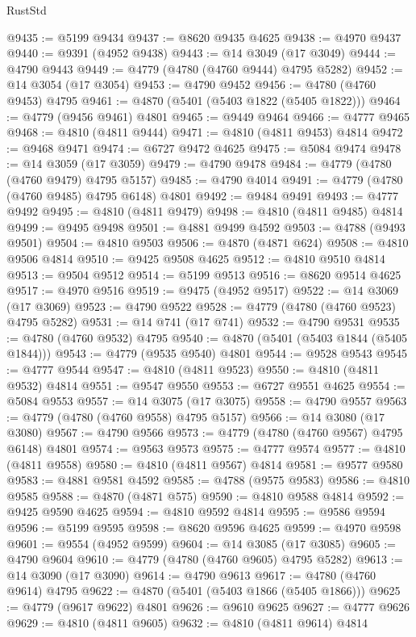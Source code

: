 \begin{lexlean}{RustStd}
\begin{coremodule}
@9435 := @5199 @9434
@9437 := @8620 @9435 @4625
@9438 := @4970 @9437
@9440 := @9391 (@4952 @9438)
@9443 := @14 @3049 (@17 @3049)
@9444 := @4790 @9443
@9449 := @4779 (@4780 (@4760 @9444) @4795 @5282)
@9452 := @14 @3054 (@17 @3054)
@9453 := @4790 @9452
@9456 := @4780 (@4760 @9453) @4795
@9461 := @4870 (@5401 (@5403 @1822 (@5405 @1822)))
@9464 := @4779 (@9456 @9461) @4801
@9465 := @9449 @9464
@9466 := @4777 @9465
@9468 := @4810 (@4811 @9444)
@9471 := @4810 (@4811 @9453) @4814
@9472 := @9468 @9471
@9474 := @6727 @9472 @4625
@9475 := @5084 @9474
@9478 := @14 @3059 (@17 @3059)
@9479 := @4790 @9478
@9484 := @4779 (@4780 (@4760 @9479) @4795 @5157)
@9485 := @4790 @4014
@9491 := @4779 (@4780 (@4760 @9485) @4795 @6148) @4801
@9492 := @9484 @9491
@9493 := @4777 @9492
@9495 := @4810 (@4811 @9479)
@9498 := @4810 (@4811 @9485) @4814
@9499 := @9495 @9498
@9501 := @4881 @9499 @4592
@9503 := @4788 (@9493 @9501)
@9504 := @4810 @9503
@9506 := @4870 (@4871 @624)
@9508 := @4810 @9506 @4814
@9510 := @9425 @9508 @4625
@9512 := @4810 @9510 @4814
@9513 := @9504 @9512
@9514 := @5199 @9513
@9516 := @8620 @9514 @4625
@9517 := @4970 @9516
@9519 := @9475 (@4952 @9517)
@9522 := @14 @3069 (@17 @3069)
@9523 := @4790 @9522
@9528 := @4779 (@4780 (@4760 @9523) @4795 @5282)
@9531 := @14 @741 (@17 @741)
@9532 := @4790 @9531
@9535 := @4780 (@4760 @9532) @4795
@9540 := @4870 (@5401 (@5403 @1844 (@5405 @1844)))
@9543 := @4779 (@9535 @9540) @4801
@9544 := @9528 @9543
@9545 := @4777 @9544
@9547 := @4810 (@4811 @9523)
@9550 := @4810 (@4811 @9532) @4814
@9551 := @9547 @9550
@9553 := @6727 @9551 @4625
@9554 := @5084 @9553
@9557 := @14 @3075 (@17 @3075)
@9558 := @4790 @9557
@9563 := @4779 (@4780 (@4760 @9558) @4795 @5157)
@9566 := @14 @3080 (@17 @3080)
@9567 := @4790 @9566
@9573 := @4779 (@4780 (@4760 @9567) @4795 @6148) @4801
@9574 := @9563 @9573
@9575 := @4777 @9574
@9577 := @4810 (@4811 @9558)
@9580 := @4810 (@4811 @9567) @4814
@9581 := @9577 @9580
@9583 := @4881 @9581 @4592
@9585 := @4788 (@9575 @9583)
@9586 := @4810 @9585
@9588 := @4870 (@4871 @575)
@9590 := @4810 @9588 @4814
@9592 := @9425 @9590 @4625
@9594 := @4810 @9592 @4814
@9595 := @9586 @9594
@9596 := @5199 @9595
@9598 := @8620 @9596 @4625
@9599 := @4970 @9598
@9601 := @9554 (@4952 @9599)
@9604 := @14 @3085 (@17 @3085)
@9605 := @4790 @9604
@9610 := @4779 (@4780 (@4760 @9605) @4795 @5282)
@9613 := @14 @3090 (@17 @3090)
@9614 := @4790 @9613
@9617 := @4780 (@4760 @9614) @4795
@9622 := @4870 (@5401 (@5403 @1866 (@5405 @1866)))
@9625 := @4779 (@9617 @9622) @4801
@9626 := @9610 @9625
@9627 := @4777 @9626
@9629 := @4810 (@4811 @9605)
@9632 := @4810 (@4811 @9614) @4814

\end{coremodule}
\end{lexlean}

